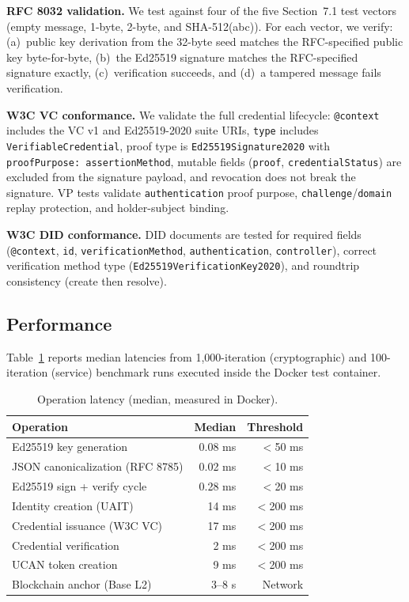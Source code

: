 \documentclass[conference]{IEEEtran}
\begin{document}
\textbf{RFC 8032 validation.} We test against four of the five Section~7.1 test vectors (empty message, 1-byte, 2-byte, and SHA-512(abc)). For each vector, we verify: (a)~public key derivation from the 32-byte seed matches the RFC-specified public key byte-for-byte, (b)~the Ed25519 signature matches the RFC-specified signature exactly, (c)~verification succeeds, and (d)~a tampered message fails verification.

\textbf{W3C VC conformance.} We validate the full credential lifecycle: \texttt{@context} includes the VC v1 and Ed25519-2020 suite URIs, \texttt{type} includes \texttt{VerifiableCredential}, proof type is \texttt{Ed25519Signature2020} with \texttt{proofPurpose: assertionMethod}, mutable fields (\texttt{proof}, \texttt{credentialStatus}) are excluded from the signature payload, and revocation does not break the signature. VP tests validate \texttt{authentication} proof purpose, \texttt{challenge}/\texttt{domain} replay protection, and holder-subject binding.

\textbf{W3C DID conformance.} DID documents are tested for required fields (\texttt{@context}, \texttt{id}, \texttt{verificationMethod}, \texttt{authentication}, \texttt{controller}), correct verification method type (\texttt{Ed25519VerificationKey2020}), and roundtrip consistency (create then resolve).

\subsection{Performance}

Table~\ref{tab:performance} reports median latencies from 1,000-iteration (cryptographic) and 100-iteration (service) benchmark runs executed inside the Docker test container.

\begin{table}[htbp]
\centering
\caption{Operation latency (median, measured in Docker).}
\label{tab:performance}
\begin{tabular}{lrr}
\toprule
\textbf{Operation} & \textbf{Median} & \textbf{Threshold} \\
\midrule
Ed25519 key generation & 0.08 ms & $<$50 ms \\
JSON canonicalization (RFC 8785) & 0.02 ms & $<$10 ms \\
Ed25519 sign + verify cycle & 0.28 ms & $<$20 ms \\
Identity creation (UAIT) & 14 ms & $<$200 ms \\
Credential issuance (W3C VC) & 17 ms & $<$200 ms \\
Credential verification & 2 ms & $<$200 ms \\
UCAN token creation & 9 ms & $<$200 ms \\
Blockchain anchor (Base L2) & 3--8 s & Network \\
\bottomrule
\end{tabular}
\end{table}
\end{document}
